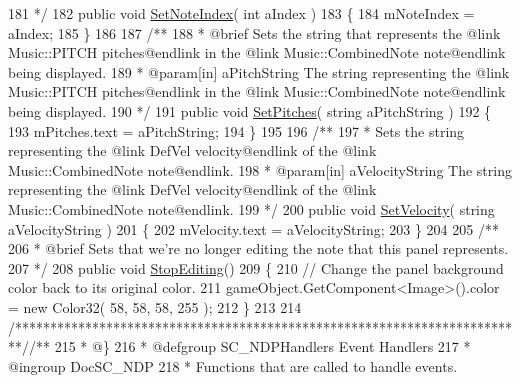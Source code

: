 \begin{DoxyCodeInclude}
181 \textcolor{comment}{    */}
182     \textcolor{keyword}{public} \textcolor{keywordtype}{void} \hyperlink{group___s_c___n_d_p_unity_gaf3160e3686e44e7718768242438ea1cc}{SetNoteIndex}( \textcolor{keywordtype}{int} aIndex )
183     \{
184         mNoteIndex = aIndex;
185     \}
186 \textcolor{comment}{}
187 \textcolor{comment}{    /**}
188 \textcolor{comment}{     * @brief Sets the string that represents the @link Music::PITCH pitches@endlink in the @link
       Music::CombinedNote note@endlink being displayed.}
189 \textcolor{comment}{     * @param[in] aPitchString The string representing the @link Music::PITCH pitches@endlink in the @link
       Music::CombinedNote note@endlink being displayed.}
190 \textcolor{comment}{    */}
191     \textcolor{keyword}{public} \textcolor{keywordtype}{void} \hyperlink{group___s_c___n_d_p_unity_gad9bf776f0c51cf6170faccf9fc4ac7e0}{SetPitches}( \textcolor{keywordtype}{string} aPitchString )
192     \{
193         mPitches.text = aPitchString;
194     \}
195 \textcolor{comment}{}
196 \textcolor{comment}{    /**}
197 \textcolor{comment}{     * Sets the string representing the @link DefVel velocity@endlink of the @link Music::CombinedNote
       note@endlink.}
198 \textcolor{comment}{     * @param[in] aVelocityString The string representing the @link DefVel velocity@endlink of the @link
       Music::CombinedNote note@endlink.}
199 \textcolor{comment}{    */}
200     \textcolor{keyword}{public} \textcolor{keywordtype}{void} \hyperlink{group___s_c___n_d_p_unity_ga8a2fef715606caa884c7b490850fb9b7}{SetVelocity}( \textcolor{keywordtype}{string} aVelocityString )
201     \{
202         mVelocity.text = aVelocityString;
203     \}
204 \textcolor{comment}{}
205 \textcolor{comment}{    /**}
206 \textcolor{comment}{     * @brief Sets that we're no longer editing the note that this panel represents.}
207 \textcolor{comment}{    */}
208     \textcolor{keyword}{public} \textcolor{keywordtype}{void} \hyperlink{group___s_c___n_d_p_unity_ga92d0f078c4efd6c207173a10e31b5065}{StopEditing}()
209     \{
210         \textcolor{comment}{// Change the panel background color back to its original color.}
211         gameObject.GetComponent<Image>().color = \textcolor{keyword}{new} Color32( 58, 58, 58, 255 );
212     \}
213 
214     \textcolor{comment}{/*************************************************************************/}\textcolor{comment}{/** }
215 \textcolor{comment}{    * @\}}
216 \textcolor{comment}{    * @defgroup SC\_NDPHandlers Event Handlers}
217 \textcolor{comment}{    * @ingroup DocSC\_NDP}
218 \textcolor{comment}{    * Functions that are called to handle events.}

\end{DoxyCodeInclude}
